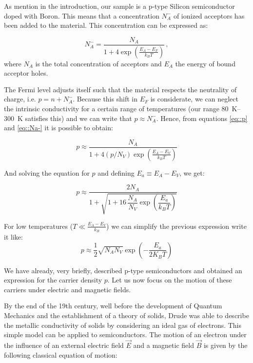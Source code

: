 \documentclass[11pt,a4paper]{article}
\begin{document}
As mention in the introduction, our sample is a p-type Silicon semiconductor doped with Boron. This means that a concentration $N_A^-$ of ionized acceptors has been added to the material. This concentration can be expressed as:

\begin{equation}\label{eq::Na-}
N_A^-=\frac{N_A}{1+4\exp\left(\frac{E_A-E_F}{k_BT}\right)}\,,
\end{equation}
where $N_A$ is the total concentration of acceptors and $E_A$ the energy of bound acceptor holes.

The Fermi level adjusts itself such that the material respects the neutrality of charge, i.e. $p=n+N_A^-$. Because this shift in $E_F$ is considerate, we can neglect the intrinsic conductivity for a certain range of temperatures (our range \SIrange{80}{300}{\kelvin} satisfies this) and we can write that $p\approx N_A^-$. Hence, from equations \eqref{eq::p} and \eqref{eq::Na-} it is possible to obtain:

\begin{equation*}
p\approx\frac{N_A}{1+4(p/N_V)\exp\left(\frac{E_A-E_V}{k_BT}\right)}
\end{equation*}

And solving the equation for $p$ and defining $E_a\equiv E_A-E_V$, we get:

\begin{equation}\label{eq:p_final}
p\approx\frac{2N_A}{1+\sqrt{1+16\,\dfrac{N_A}{N_V}\exp\left(\dfrac{E_a}{k_BT}\right)}}
\end{equation}

For low temperatures ($T\ll\frac{E_A-E_V}{k_B}$) we can simplify the previous expression write it like:
\begin{equation}\label{eq:p_final_approx}
p\approx \frac{1}{2}\sqrt{N_AN_V}\exp\left(-\frac{E_a}{2K_BT}\right)
\end{equation}

We have already, very briefly, described p-type semiconductors and obtained an expression for the carrier density $p$. Let us now focus on the motion of these carriers under electric and magnetic fields.

By the end of the 19th century, well before the development of Quantum Mechanics and the establishment of a theory of solids, Drude was able to describe the metallic conductivity of solids by considering an ideal gas of electrons. This simple model can be applied to semiconductors. The motion of an electron under the influence of an external electric field $\vec{E}$ and a magnetic field $\vec{B}$ is given by the following classical equation of motion:
\end{document}
